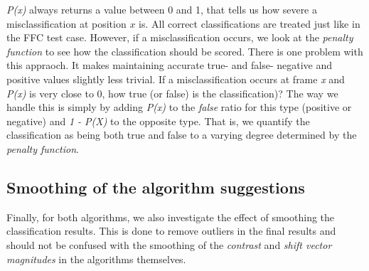 \emph{P(x)} always returns a value between 0 and 1, that tells us how severe a misclassification at position $x$ is. All correct classifications are treated just like in the FFC test case. However, if a misclassification occurs, we look at the \textit{penalty function} to see how the classification should be scored. There is one problem with this appraoch. It makes maintaining accurate true- and false- negative and positive values slightly less trivial. If a misclassification occurs at frame \textit{x} and \emph{P(x)} is very close to 0, how true (or false) is the classification)? The way we handle this is simply by adding \textit{P(x)} to the \textit{false} ratio for this type (positive or negative) and \textit{1 - P(X)} to the opposite type. That is, we quantify the classification as being both true and false to a varying degree determined by the \textit{penalty function}.
%
\subsection{Smoothing of the algorithm suggestions}\label{sec:classsmooth}
%
Finally, for both algorithms, we also investigate the effect of smoothing the classification results. This is done to remove outliers in the final results and should not be confused with the smoothing of the \textit{contrast} and \textit{shift vector magnitudes} in the algorithms themselves.
%
